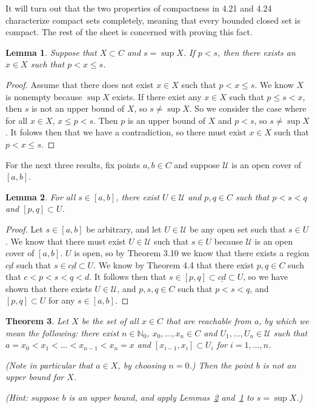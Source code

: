 \documentclass[12pt]{article}
\newcommand{\bbN}{\mathbb{N}}
\renewcommand{\_}[1]{\underline{ #1 }}
\newtheorem{theorem}{Theorem}[section]
\newtheorem{lemma}[theorem]{Lemma}
\theoremstyle{definition}
\numberwithin{equation}{subsection}
\begin{document}
It will turn out that the two properties of compactness in 4.21 and 4.24 characterize compact sets completely, meaning that every bounded closed set is compact.  The rest of the sheet is concerned with proving this fact.

\begin{lemma}
\label{lem1}
Suppose that $X \subset C$ and $s = \sup X$.
If $p<s$, then there exists an $x\in X$ such that $p < x \le s$.
\end{lemma}

\begin{proof}
Assume that there does not exist $x \in X$ such that $p < x \leq s$. We know $X$ is nonempty because $\sup X$ exists. If there exist any $x \in X$ such that $p \leq s < x$, then $s$ is not an upper bound of $X$, so $s \not = \sup X$. So we consider the case where for all $x \in X$, $x \leq p < s$. Then $p$ is an upper bound of $X$ and $p < s$, so $s \not = \sup X$. It folows then that we have a contradiction, so there must exist $x \in X$ such that $p < x \leq s$.
\end{proof}

\newcommand\cU{\mathcal U}

For the next three results, fix points $a,b\in C$ and suppose $\cU$ is an open cover of $[a,b]$.

\begin{lemma}
\label{lem2}
For all $s\in[a,b]$, there exist $U\in\cU$ and $p,q\in C$ such that $p<s<q$ and $[p,q]\subset U$.
\end{lemma}

\begin{proof}
Let $s \in [a,b]$ be arbitrary, and let $U \in \mathcal{U}$ be any open set such that $s \in U$. We know that there must exist $U \in \mathcal{U}$ such that $s \in U$ because $\mathcal{U}$ is an open cover of $[a,b]$. $U$ is open, so by Theorem 3.10 we know that there exists a region $\_{cd}$ such that $s \in \_{cd} \subset U$. We know by Theorem 4.4 that there exist $p,q \in C$ such that $c < p < s < q < d$. It follows then that $s \in [p,q] \subset \_{cd} \subset U$, so we have shown that there exists $U \in \mathcal{U}$, and $p,s,q \in C$ such that $p < s < q$, and $[p,q] \subset U$ for any $s \in [a,b]$.
\end{proof}

\begin{theorem}
Let $X$ be the set of all $x\in C$ that are \emph{reachable from $a$}, by which we mean the following: there exist $n\in\bbN_0$, $x_0,\ldots,x_n\in C$ and $U_1,\ldots,U_n\in\cU$ such that $a=x_0<x_1<\ldots<x_{n-1}<x_n=x$ and $[x_{i-1},x_i]\subset U_i$ for $i=1,\ldots,n$.

(Note in particular that $a\in X$, by choosing $n=0$.)
Then the point $b$ is not an upper bound for $X$.

(Hint: suppose $b$ is an upper bound, and apply Lemmas~\ref{lem2} and~\ref{lem1} to $s=\sup X$.)
\end{theorem}
\end{document}
